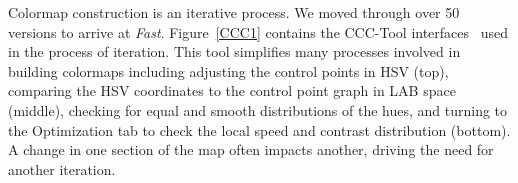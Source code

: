 \documentclass{IEEEcsmag}
\newcommand*{\km}[1]{\textcolor{km}{\emph{\textbf{#1} -- KM}}}
\newcommand*{\fs}[1]{\textcolor{fs}{\emph{\textbf{#1} -- FS}}}
\newcommand*{\colormap}[1]{\textsl{#1}\xspace}
\newcommand*{\blueorange}{\colormap{Blue-Orange Diverging}}
\newcommand*{\fast}{\colormap{Fast}}
\begin{document}
Colormap construction is an iterative process.
We moved through over 50 versions to arrive at \fast.
Figure~\ref{CCC1} contains the CCC-Tool interfaces~\cite{Nardini2021} used in the process of iteration.
This tool simplifies many processes involved in building colormaps including adjusting the control points in HSV (top), comparing the HSV coordinates to the control point graph in LAB space (middle), checking for equal and smooth distributions of the hues, and turning to the Optimization tab to check the local speed and contrast distribution (bottom).
A change in one section of the map often impacts another, driving the need for another iteration.





\end{document}
